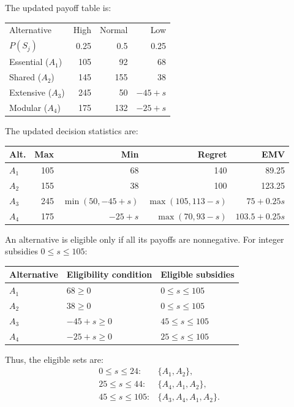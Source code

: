 The updated payoff table is:

\begin{center}\small\setlength{\tabcolsep}{4pt}
	\begin{tabular}{lrrr}\toprule
		Alternative & High & Normal & Low\\
		$P(S_j)$ & 0.25 & 0.5 & 0.25\\ \midrule
				Essential ($A_1$) & 105 & 92 & 68\\
		Shared ($A_2$) & 145 & 155 & 38\\
		Extensive ($A_3$) & 245 & 50 & $-45+s$\\
		Modular ($A_4$) & 175 & 132 & $-25+s$\\
		\bottomrule
	\end{tabular}
\end{center}

The updated decision statistics are:

\begin{center}\small\setlength{\tabcolsep}{4pt}
	\begin{tabular}{lrrrr}\toprule
		Alt. & Max & Min & Regret & EMV\\ \midrule
				$A_1$ & 105 & 68 & 140 & 89.25\\
		$A_2$ & 155 & 38 & 100 & 123.25\\
		$A_3$ & 245 & $\min(50,-45+s)$ & $\max(105,113-s)$ & $75+0.25s$\\
		$A_4$ & 175 & $-25+s$ & $\max(70,93-s)$ & $103.5+0.25s$\\
		\bottomrule
	\end{tabular}
\end{center}

An alternative is eligible only if all its payoffs are nonnegative.
For integer subsidies $0\le s\le105$:

\begin{center}
\begin{tabular}{lll}\toprule
Alternative & Eligibility condition & Eligible subsidies\\\midrule
$A_1$ & $68\ge0$ & $0\le s\le105$\\
$A_2$ & $38\ge0$ & $0\le s\le105$\\
$A_3$ & $-45+s\ge0$ & $45\le s\le105$\\
$A_4$ & $-25+s\ge0$ & $25\le s\le105$\\
\bottomrule
\end{tabular}
\end{center}

Thus, the eligible sets are:
\[
\begin{array}{ll}
0\le s\le24: & \{A_1,A_2\},\\
25\le s\le44: & \{A_4,A_1,A_2\},\\
45\le s\le105: & \{A_3,A_4,A_1,A_2\}.
\end{array}
\]


